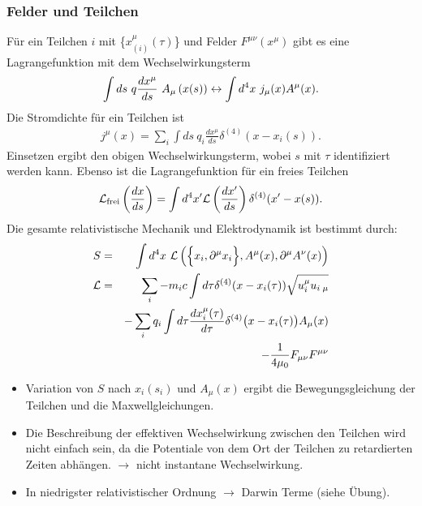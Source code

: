\subsubsection{Felder und Teilchen}
Für ein Teilchen $i$ mit \{$x_{(i)}^{\mu}(\tau)$\} und Felder $F^ {\mu\nu}(x^ {\mu})$ gibt es eine Lagrangefunktion mit dem Wechselwirkungsterm
\begin{eqnarray*} \int ds \ q \frac{dx^ {\mu}} {d s}\ A_{\mu}\left(x(s)\right) \leftrightarrow \int d^4x \ j_{\mu}(x)A^ {\mu}(x).\end{eqnarray*}
Die Stromdichte für ein Teilchen ist
\begin{eqnarray*} j^ {\mu}(x) = \sum_i\int ds \ q_i \frac{dx^ {\mu}}{d s}\delta^ {(4)}(x-x_i(s)). \end{eqnarray*}
Einsetzen ergibt den obigen Wechselwirkungsterm, wobei $s$ mit $\tau$ identifiziert werden kann.
Ebenso ist die Lagrangefunktion für ein freies Teilchen
\begin{eqnarray*}
\mathcal L_{\text{frei}}\left( \frac{dx}{ds}\right) = \int d^ 4x' \mathcal L \left( \frac{dx'}{ds}\right )\delta^ {(4)}(x'-x(s)).\end{eqnarray*}
Die gesamte relativistische Mechanik und Elektrodynamik ist bestimmt durch:
\begin{eqnarray*}
S &=& \int d^4x \ \mathcal L \left ( \Big\{x_i, \partial^{\mu}x_i\Big \} ,A^{\mu}(x),\partial^{\mu} A^{\nu}(x) \right )\\
\mathcal L &=& \sum \limits_i - m_ic \int d\tau \delta^{(4)}(x-x_i(\tau))\sqrt{u_{i}^{\mu}u_{i\;\mu}}\\ &{}& - \sum\limits_i q_i \int d\tau \frac{dx_{i}^{\mu}(\tau)}{d\tau} \delta^{(4)}\big(x-x_{i}(\tau)\big)A_{\mu}(x) \\&{}& -\frac 1 {4 \mu_0}F_{\mu\nu}F^{\mu\nu}
\end{eqnarray*}
\begin{itemize}
\item Variation von $S$ nach $x_i(s_i)$ und $A_{\mu}(x)$ ergibt die Bewegungsgleichung der Teilchen und die Maxwellgleichungen.
\item Die Beschreibung der effektiven Wechselwirkung zwischen den Teilchen wird nicht einfach sein, da die Potentiale von dem Ort der Teilchen zu retardierten Zeiten abhängen. $\longrightarrow$ nicht instantane Wechselwirkung.
\item In niedrigster relativistischer Ordnung $\longrightarrow$ Darwin Terme (siehe Übung).
\end{itemize}
